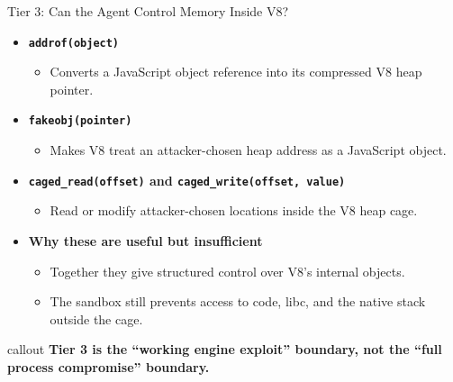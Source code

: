 \documentclass[aspectratio=169,t]{beamer}
\newcommand{\callout}[1]{%
  \vspace{0.45em}%
  \begin{beamercolorbox}[wd=\linewidth,sep=0.55em,rounded=false]{callout}
    #1
  \end{beamercolorbox}%
  \vspace{0.35em}%
}
\begin{document}
\begin{frame}{Tier 3: Can the Agent Control Memory Inside V8?}
  \begin{itemize}
    \item \textbf{\texttt{addrof(object)}}
      \begin{itemize}
        \item Converts a JavaScript object reference into its compressed V8 heap pointer.
      \end{itemize}
    \item \textbf{\texttt{fakeobj(pointer)}}
      \begin{itemize}
        \item Makes V8 treat an attacker-chosen heap address as a JavaScript object.
      \end{itemize}
    \item \textbf{\texttt{caged\_read(offset)} and \texttt{caged\_write(offset, value)}}
      \begin{itemize}
        \item Read or modify attacker-chosen locations inside the V8 heap cage.
      \end{itemize}
    \item \textbf{Why these are useful but insufficient}
      \begin{itemize}
        \item Together they give structured control over V8's internal objects.
        \item The sandbox still prevents access to code, libc, and the native stack outside the cage.
      \end{itemize}
  \end{itemize}

  \vfill
  \callout{\textbf{Tier 3 is the “working engine exploit” boundary, not the “full process compromise” boundary.}}
\end{frame}
\end{document}
